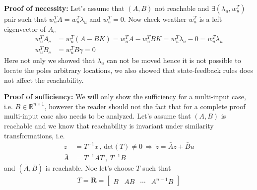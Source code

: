 \documentclass[twoside]{article}
\begin{document}
\textbf{Proof of necessity: } Let's assume that $(A,B)$ not reachable and $\exists (\lambda_u , w_u^T)$ pair such that
$w_u^T A = w_u^T \lambda_u $ and $w_u^T = 0$. Now check weather $w_u^T$ is a left eigenvector of $A_c$
%
\begin{align*}
	w_u^T A_c &= w_u^T (A - B K ) = w_u^T A - w_u^T B K = w_u^T \lambda_u - 0 = w_u^T \lambda_u
	\\
	w_u^T B_c &= w_u^T B \gamma = 0
\end{align*} 
%
Here not only we showed that $\lambda_u$ can not be moved hence it is not possible to locate the poles
arbitrary locations, we also showed that state-feedback rules does not affect the reachability.

\textbf{Proof of sufficiency:} We will only show the sufficiency for a multi-input case, i.e. $B \in \mathbb{R}^{n \times 1}$, 
however the reader should not the fact that for a complete proof multi-input case also needs to be analyzed. 
Let's assume that $(A,B)$ is reachable and we know that reachability is invariant under similarity transformations, i.e.
%
\begin{align*}
	z &= T^{-1} x \, , \, \mathrm{det}(T) \neq 0 \, \Rightarrow \, \dot{z} = \bar{A} z + \bar{B} u \\
	\bar{A} &= T^{-1} A T \ , \ T^{-1} B 
\end{align*}
%
and $(\bar{A}, \bar{B})$ is reachable. Noe let's choose $T$ such that
%
%
\begin{align*}
T = \mathbf{R} = \left[ \begin{array}{c|c|c|c} B & A B & \cdots & A^{n-1} B \end{array} \right]
\end{align*}


\end{document}

